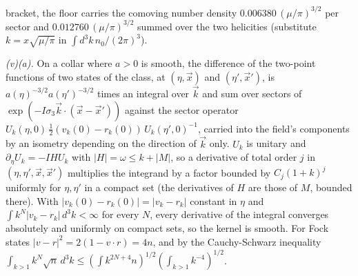 bracket, the floor carries the comoving number density $0.006380\,(\mu/\pi)^{3/2}$ per sector and $0.012760\,(\mu/\pi)^{3/2}$ summed over the two helicities (substitute $k = x\sqrt{\mu/\pi}$ in $\int d^{3}k\,n_{0}/(2\pi)^{3}$).

\emph{(v)(a).} On a collar where $a > 0$ is smooth, the difference of the two-point functions of two states of the class, at $(\eta, \vec x)$ and $(\eta', \vec x')$, is $a(\eta)^{-3/2}a(\eta')^{-3/2}$ times an integral over $\vec k$ and sum over sectors of $\exp(-I\sigma_{3}\vec k\cdot(\vec x - \vec x'))$ against the sector operator $U_{k}(\eta, 0)\,\tfrac12(v_{k}(0) - r_{k}(0))\,U_{k}(\eta', 0)^{-1}$, carried into the field's components by an isometry depending on the direction of $\vec k$ only. $U_{k}$ is unitary and $\partial_{\eta}U_{k} = -IHU_{k}$ with $|H| = \omega \le k + |M|$, so a derivative of total order $j$ in $(\eta, \eta', \vec x, \vec x')$ multiplies the integrand by a factor bounded by $C_{j}(1 + k)^{j}$ uniformly for $\eta, \eta'$ in a compact set (the derivatives of $H$ are those of $M$, bounded there). With $|v_{k}(0) - r_{k}(0)| = |v_{k} - r_{k}|$ constant in $\eta$ and $\int k^{N}|v_{k} - r_{k}|\,d^{3}k < \infty$ for every $N$, every derivative of the integral converges absolutely and uniformly on compact sets, so the kernel is smooth. For Fock states $|v - r|^{2} = 2(1 - v\cdot r) = 4n$, and by the Cauchy-Schwarz inequality $\int_{k > 1}k^{N}\sqrt{n}\,d^{3}k \le (\int k^{2N+4}n)^{1/2}(\int_{k>1}k^{-4})^{1/2}$.

